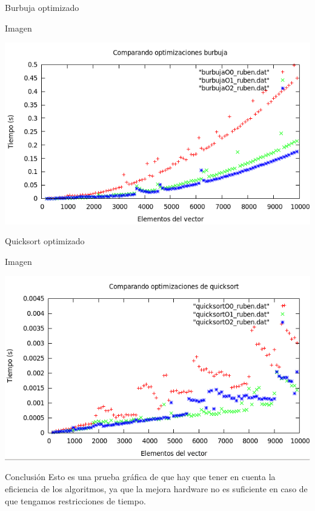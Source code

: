 \documentclass[compress]{beamer}
\begin{document}
\begin{frame}{Burbuja optimizado}
	\begin{alertblock}{Imagen}
	\begin{center}
	\includegraphics[scale=0.45]{../Graficas/Burbuja/burbuja_optimizacion.png}
	\end{center}
	\end{alertblock}
\end{frame}

\begin{frame}{Quicksort optimizado}
	\begin{alertblock}{Imagen}
	\begin{center}
	\includegraphics[scale=0.45]{../Graficas/Quicksort/quicksort_optimizacion.png}	
	\end{center}
	\end{alertblock}
\end{frame}



\begin{frame}
	\begin{alertblock}{Conclusión}
	Esto es una prueba gráfica de que hay que tener en cuenta la eficiencia de los 				algoritmos, ya que la mejora hardware no es suficiente en caso de que tengamos 				restricciones de tiempo.
	\end{alertblock}
\end{frame}
\end{document}
